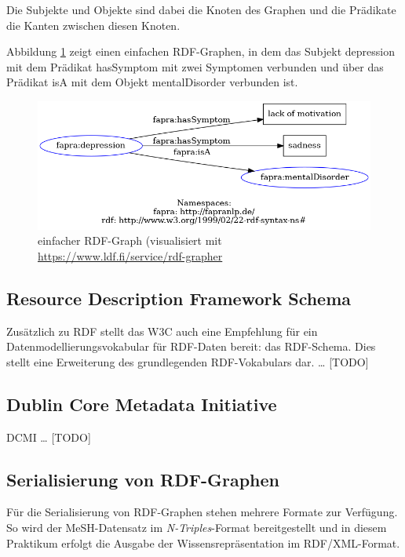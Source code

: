 Die Subjekte und Objekte sind dabei die Knoten des Graphen und die Prädikate die Kanten zwischen diesen Knoten.

Abbildung \ref{fig:rdfgraph} zeigt einen einfachen RDF-Graphen, in dem das Subjekt \glqq depression\grqq{} mit dem Prädikat \glqq hasSymptom\grqq{} mit zwei Symptomen verbunden und über das Prädikat \glqq isA\grqq{} mit dem Objekt \glqq mentalDisorder\grqq{} verbunden ist.

\begin{figure}[h]
    \centering
    \includegraphics[width=\textwidth]{pictures/rdf-graph.png}
    \caption{einfacher RDF-Graph (visualisiert mit \url{https://www.ldf.fi/service/rdf-grapher}}
    \label{fig:rdfgraph}
\end{figure}

\subsection{Resource Description Framework Schema}

Zusätzlich zu RDF stellt das W3C auch eine Empfehlung für ein Datenmodellierungsvokabular für RDF-Daten bereit: das RDF-Schema. Dies stellt eine Erweiterung des grundlegenden RDF-Vokabulars dar. \dots{} [TODO]

\subsection{Dublin Core Metadata Initiative}
DCMI \dots{} [TODO]

\subsection{Serialisierung von RDF-Graphen}

Für die Serialisierung von RDF-Graphen stehen mehrere Formate zur Verfügung. So wird der MeSH-Datensatz im \emph{N-Triples}-Format bereitgestellt und in diesem Praktikum erfolgt die Ausgabe der Wissensrepräsentation im RDF/XML-Format.

